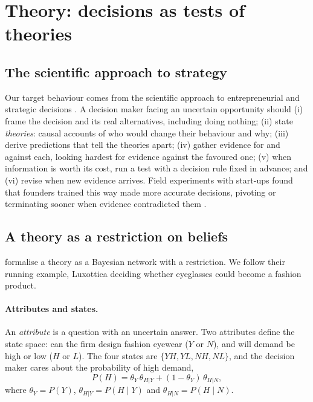 \section{Theory: decisions as tests of theories}\label{sec:theory}

\subsection{The scientific approach to strategy}
Our target behaviour comes from the scientific approach to entrepreneurial and strategic decisions
\citep{camuffo2020scientific,camuffo2024theory}. A decision maker facing an uncertain opportunity should (i) frame the
decision and its real alternatives, including doing nothing; (ii) state \emph{theories}: causal accounts of who would
change their behaviour and why; (iii) derive predictions that tell the theories apart; (iv) gather evidence for and
against each, looking hardest for evidence against the favoured one; (v) when information is worth its cost, run a test
with a decision rule fixed in advance; and (vi) revise when new evidence arrives. Field experiments with start-ups found
that founders trained this way made more accurate decisions, pivoting or terminating sooner when evidence contradicted
them \citep{camuffo2020scientific}.

\subsection{A theory as a restriction on beliefs}
\citet{camuffo2024theory} formalise a theory as a Bayesian network with a restriction. We follow their running example,
Luxottica deciding whether eyeglasses could become a fashion product.

\paragraph{Attributes and states.} An \emph{attribute} is a question with an uncertain answer. Two attributes define the
state space: can the firm design fashion eyewear ($Y$ or $N$), and will demand be high or low ($H$ or $L$). The four
states are $\{YH, YL, NH, NL\}$, and the decision maker cares about the probability of high demand,
\begin{equation}
  P(H) = \theta_Y\,\theta_{H|Y} + (1-\theta_Y)\,\theta_{H|N},
  \label{eq:ph}
\end{equation}
where $\theta_Y = P(Y)$, $\theta_{H|Y} = P(H\mid Y)$ and $\theta_{H|N} = P(H\mid N)$.

